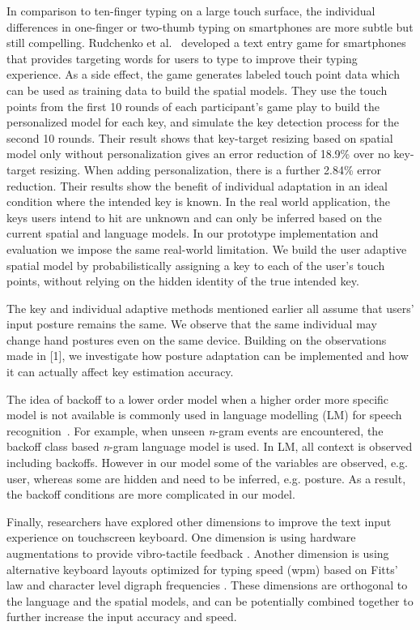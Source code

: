 \documentclass{sigchi}
\begin{document}
In comparison to ten-finger typing on a large touch surface, the individual differences in one-finger or two-thumb typing on smartphones are more subtle but still compelling. Rudchenko et al.~\cite{Rudchenko:2011}
developed a text entry game for smartphones that provides 
targeting words for users to type to improve their typing experience. As a side effect,
the game generates labeled touch point data which can be used as
training data to build the spatial models. They use the touch points from the first 10 rounds of each 
participant's game play to build the personalized model for each key, and simulate the key detection
process for the second 10 rounds. Their result shows that key-target resizing based on
spatial model only without personalization gives an error reduction of 18.9\% over no key-target resizing. When adding personalization, there is a further 2.84\% error reduction.
Their results show the benefit of individual adaptation in an ideal condition where the 
intended key is known. In the real world application, the keys users intend to hit are unknown and can only be inferred based on the current spatial and language models. In our prototype implementation and evaluation we impose the same real-world limitation. We build the user adaptive spatial model by probabilistically assigning a key to each of the user’s touch points, without relying on the hidden identity of the true intended key. 

The key and individual adaptive methods mentioned earlier all assume that users' input posture
remains the same. We observe that the same individual may change hand postures even on the same device. Building on the observations made in [1], we investigate how posture adaptation can be implemented and how it can actually affect key estimation accuracy.

The idea of backoff to a lower order model when a higher order more specific model is not available is commonly used in language modelling (LM) for speech recognition~\cite{Katz:1987, Zitouni:2007}. For example, when unseen \textit{n}-gram events are encountered, the backoff class based \textit{n}-gram language model is used.  In LM,  all context is observed including backoffs. However in our model some of the variables are observed, e.g. user, whereas some are hidden and need to be inferred, e.g. posture. As a result, the backoff conditions are more complicated in our model.

Finally, researchers have explored other dimensions to improve the 
text input experience on touchscreen keyboard. One dimension is using hardware
augmentations to provide vibro-tactile feedback \cite{Brewster:2007, Hoggan:2008}. 
Another dimension is using alternative keyboard layouts optimized for typing speed (wpm)
based on Fitts' law and character level digraph frequencies \cite{Zhai:2000, MacKenzie:1999}.
These dimensions are orthogonal to the language and the spatial models, and can be potentially 
combined together to further increase the input accuracy and speed.
\end{document}
